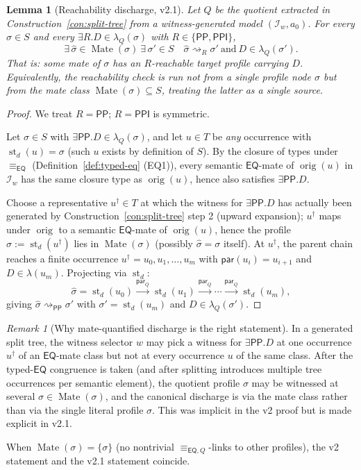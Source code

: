 \documentclass[11pt]{article}
\newtheorem{lemma}[theorem]{Lemma}
\theoremstyle{definition}
\theoremstyle{remark}
\newtheorem{remark}[theorem]{Remark}
\newcommand{\PP}{\mathsf{PP}}
\newcommand{\PPI}{\mathsf{PPI}}
\newcommand{\EQ}{\mathsf{EQ}}
\newcommand{\st}{\operatorname{st}}
\newcommand{\orig}{\operatorname{orig}}
\newcommand{\eqcong}{\equiv_{\EQ}}
\newcommand{\eqQ}{\equiv_{\EQ,Q}}
\newcommand{\Mate}{\operatorname{Mate}}
\newcommand{\reach}{\rightsquigarrow}
\begin{document}
\begin{lemma}[Reachability discharge, v2.1]\label{lem:reach-discharge}
Let $Q$ be the quotient extracted in
Construction~\ref{con:split-tree} from a witness-generated model
$(\mathcal{I}_w, a_0)$.  For every $\sigma \in S$ and every
$\exists R.D \in \lambda_Q(\sigma)$ with $R \in \{\PP, \PPI\}$,
\[
\exists\,\widehat{\sigma}\in\Mate(\sigma)\ \exists\,\sigma'\in S\quad
\widehat{\sigma}\reach_{R}\sigma'\ \text{and}\ D\in\lambda_Q(\sigma').
\]
That is: \emph{some} mate of $\sigma$ has an $R$-reachable target
profile carrying $D$.  Equivalently, the reachability check is run
not from a single profile node $\sigma$ but from the mate class
$\Mate(\sigma)\subseteq S$, treating the latter as a single source.
\end{lemma}

\begin{proof}
We treat $R = \PP$; $R = \PPI$ is symmetric.

Let $\sigma \in S$ with $\exists\PP.D \in \lambda_Q(\sigma)$, and
let $u\in T$ be \emph{any} occurrence with $\st_d(u) = \sigma$ (such
$u$ exists by definition of $S$).  By the closure of types under
$\eqcong$ (Definition~\ref{def:typed-eq} (EQ1)), every semantic
$\EQ$-mate of $\orig(u)$ in $\mathcal{I}_w$ has the same closure
type as $\orig(u)$, hence also satisfies $\exists\PP.D$.

Choose a representative $u^\dagger\in T$ at which the witness for
$\exists\PP.D$ has actually been generated by
Construction~\ref{con:split-tree} step 2 (upward expansion); $u^\dagger$
maps under $\orig$ to a semantic $\EQ$-mate of $\orig(u)$, hence the
profile $\widehat{\sigma}:=\st_d(u^\dagger)$ lies in $\Mate(\sigma)$
(possibly $\widehat{\sigma}=\sigma$ itself).  At $u^\dagger$, the
parent chain reaches a finite occurrence $u^\dagger =
u_0,u_1,\ldots,u_m$ with $\mathsf{par}(u_i)=u_{i+1}$ and
$D\in\lambda(u_m)$.  Projecting via $\st_d$:
\[
\widehat{\sigma} = \st_d(u_0) \stackrel{\mathsf{par}_Q}{\to}
\st_d(u_1) \stackrel{\mathsf{par}_Q}{\to} \cdots
\stackrel{\mathsf{par}_Q}{\to} \st_d(u_m),
\]
giving $\widehat{\sigma}\reach_{\PP}\sigma'$ with
$\sigma' = \st_d(u_m)$ and $D\in\lambda_Q(\sigma')$.
\end{proof}

\begin{remark}[Why mate-quantified discharge is the right
statement]\label{rem:mate-reach}
In a generated split tree, the witness selector $w$ may pick a
witness for $\exists\PP.D$ at one occurrence $u^\dagger$ of an
$\EQ$-mate class but not at every occurrence $u$ of the same class.
After the typed-$\EQ$ congruence is taken (and after splitting
introduces multiple tree occurrences per semantic element), the
quotient profile $\sigma$ may be witnessed at several $\widehat{\sigma}\in
\Mate(\sigma)$, and the canonical discharge is via the mate class
rather than via the single literal profile $\sigma$.  This was
implicit in the v2 proof but is made explicit in v2.1.

When $\Mate(\sigma) = \{\sigma\}$ (no nontrivial $\eqQ$-links to
other profiles), the v2 statement and the v2.1 statement coincide.
\end{remark}
\end{document}
